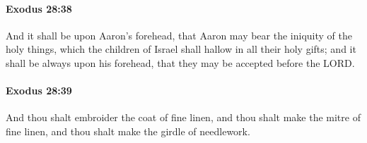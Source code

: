 		\paragraph{Exodus 28:38} %
			\label{EXODUS-28-38}

			And it shall be upon Aaron's forehead, that Aaron may bear the iniquity of the holy things, which the children of Israel shall hallow in all their holy gifts; and it shall be always upon his forehead, that they may be accepted before the LORD.


		\paragraph{Exodus 28:39} %
			\label{EXODUS-28-39}

			And thou shalt embroider the coat of fine linen, and thou shalt make the mitre of fine linen, and thou shalt make the girdle of needlework.

